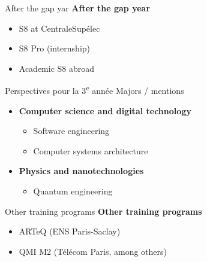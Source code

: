 \begin{frame}{After the gap yar}
  \textbf{After the gap year}
  \begin{itemize}
    \item S8 at CentraleSupélec
    \item S8 Pro (internship)
    \item Academic S8 abroad
  \end{itemize}
\end{frame}


\begin{frame}{Perspectives pour la 3\textsuperscript{e} année}
Majors / mentions
\vspace{.5em}
\begin{itemize}
  \item \textbf{Computer science and digital technology}
  \begin{itemize}
      \item Software engineering
      \item Computer systems architecture
  \end{itemize}
  \item \textbf{Physics and nanotechnologies}
  \begin{itemize}
      \item Quantum engineering
  \end{itemize}
\end{itemize}
\end{frame}

\begin{frame}{Other training programs}
  \textbf{Other training programs}
  \begin{itemize}
    \item ARTeQ (ENS Paris-Saclay)
    \item QMI M2 (Télécom Paris, among others)
  \end{itemize}
\end{frame}
